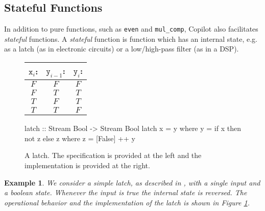 \documentclass[a4paper, 10pt]{article}
\theoremstyle{example}
\newtheorem{example}{Example}%
\begin{document}
\subsection{Stateful Functions}

In addition to pure functions, such as {\tt even} and {\tt mul\_comp},
Copilot also facilitates \emph{stateful} functions. A \emph{stateful} function
is function which has an internal state, e.g. as a latch (as in electronic
circuits) or a low/high-pass filter (as in a DSP).

\begin{figure}[ht!]
\begin{minipage}{0.3\linewidth}
\begin{tabular}{c|c|c}
$\mathtt{x}_i$: & $\mathtt{y}_{i-1}$: & $\mathtt{y}_i$:\\
\hline
$F$ & $F$ & $F$ \\
\hline
$F$ & $T$ & $T$ \\
\hline
$T$ & $F$ & $T$ \\
\hline
$T$ & $T$ & $F$
\end{tabular}
\end{minipage}
\hspace{1cm}
\begin{minipage}{0.6\linewidth}
\begin{code}
latch :: Stream Bool -> Stream Bool
latch x = y
  where
    y = if x then not z else z
      where
        z = [False] ++ y
\end{code}
\end{minipage}
\caption{A latch. The specification is provided at the left and the
implementation is provided at the right.}
\label{fig:jk_latch}
\end{figure}

\begin{example}
We consider a simple latch, as described in \cite{Farhat2004}, with a single
input and a boolean state. Whenever the input is true the internal state is reversed.
The operational behavior and the implementation of the latch is shown in Figure
\ref{fig:jk_latch}.
\end{example}
\end{document}
